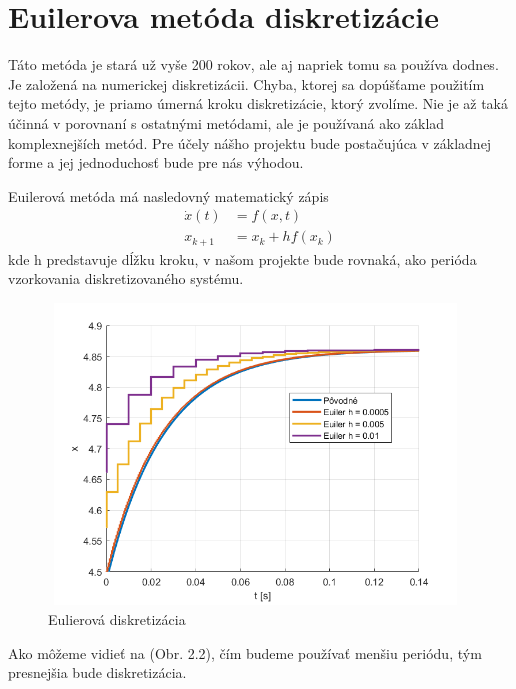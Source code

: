 \section{Euilerova metóda diskretizácie}
\label{se:diskretizacia}
Táto metóda je stará už vyše 200 rokov, ale aj napriek tomu sa používa dodnes. Je založená na numerickej diskretizácii. Chyba, ktorej sa dopúšťame použitím tejto metódy, je priamo úmerná kroku diskretizácie, ktorý zvolíme. Nie je až taká účinná v porovnaní s ostatnými metódami, ale je používaná ako základ komplexnejších metód. Pre účely nášho projektu bude postačujúca v základnej forme a jej jednoduchosť bude pre nás výhodou.

Euilerová metóda má nasledovný matematický zápis
\begin{align}
	\dot{x}(t) &= f(x,t)\\
	x_{k+1} &= x_{k} + hf(x_{k})
\end{align}
kde h predstavuje dĺžku kroku, v našom projekte bude rovnaká, ako perióda vzorkovania diskretizovaného systému.
\begin{figure}[H]
	\centering
	\includegraphics[width=11cm,height=8cm]{images/Euler_method}
	\caption{Eulierová diskretizácia}
\end{figure}
Ako môžeme vidieť na (Obr. 2.2), čím budeme používať menšiu periódu, tým presnejšia bude diskretizácia.

